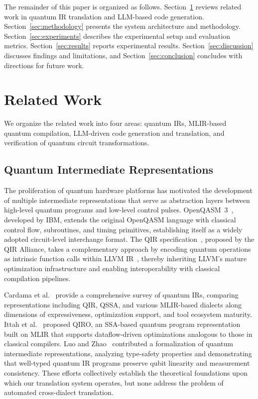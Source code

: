 \documentclass[conference]{IEEEtran}
\begin{document}
The remainder of this paper is organized as follows. Section~\ref{sec:related} reviews related work in quantum IR translation and LLM-based code generation. Section~\ref{sec:methodology} presents the system architecture and methodology. Section~\ref{sec:experiments} describes the experimental setup and evaluation metrics. Section~\ref{sec:results} reports experimental results. Section~\ref{sec:discussion} discusses findings and limitations, and Section~\ref{sec:conclusion} concludes with directions for future work.


\section{Related Work}\label{sec:related}

We organize the related work into four areas: quantum IRs, MLIR-based quantum compilation, LLM-driven code generation and translation, and verification of quantum circuit transformations.

\subsection{Quantum Intermediate Representations}

The proliferation of quantum hardware platforms has motivated the development of multiple intermediate representations that serve as abstraction layers between high-level quantum programs and low-level control pulses. OpenQASM~3~\cite{cross2022openqasm3}, developed by IBM, extends the original OpenQASM language with classical control flow, subroutines, and timing primitives, establishing itself as a widely adopted circuit-level interchange format. The QIR specification~\cite{qirspec2021}, proposed by the QIR Alliance, takes a complementary approach by encoding quantum operations as intrinsic function calls within LLVM IR~\cite{lattner2004llvm}, thereby inheriting LLVM's mature optimization infrastructure and enabling interoperability with classical compilation pipelines.

Cardama et al.~\cite{cardama2025review} provide a comprehensive survey of quantum IRs, comparing representations including QIR, QSSA, and various MLIR-based dialects along dimensions of expressiveness, optimization support, and tool ecosystem maturity. Ittah et al.~\cite{ittah2022qiro} proposed QIRO, an SSA-based quantum program representation built on MLIR that supports dataflow-driven optimizations analogous to those in classical compilers. Luo and Zhao~\cite{singhal2024formal} contributed a formalization of quantum intermediate representations, analyzing type-safety properties and demonstrating that well-typed quantum IR programs preserve qubit linearity and measurement consistency. These efforts collectively establish the theoretical foundations upon which our translation system operates, but none address the problem of automated cross-dialect translation.
\end{document}
